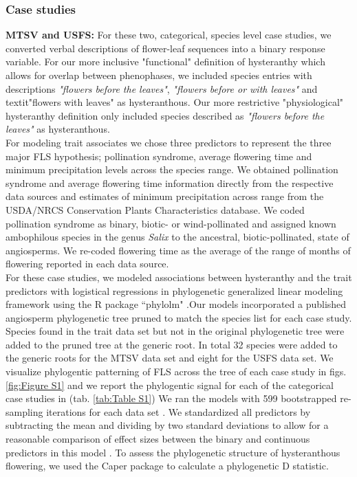 \documentclass[12pt]{article}\usepackage[]{graphicx}\usepackage[]{color}
\begin{document}
\subsubsection*{Case studies}
\indent\indent \textbf{MTSV and USFS:} For these two, categorical, species level case studies, we converted verbal descriptions of flower-leaf sequences into a binary response variable. For our more inclusive "functional" definition of hysteranthy which allows for overlap between phenophases, we included species entries with descriptions \textit{"flowers before the leaves"}, \textit{"flowers before or with leaves"} and textit{"flowers with leaves"} as hysteranthous. Our more restrictive "physiological" hysteranthy definition only included species described as \textit{"flowers before the leaves"} as hysteranthous.\\
\ident For modeling trait associates we chose three predictors to represent the three major FLS hypothesis; pollination syndrome, average flowering time and minimum precipitation levels across the species range. We obtained pollination syndrome and average flowering time information directly from the respective data sources and estimates of minimum precipitation across range from the USDA/NRCS Conservation Plants Characteristics database. We coded pollination syndrome as binary, biotic- or wind-pollinated and assigned known ambophilous species in the genus \textit{Salix} to the ancestral, biotic-pollinated, state of angiosperms. We re-coded flowering time as the average of the range of months of flowering reported in each data source.\\
\indent For these case studies, we modeled associations between hysteranthy and the trait predictors with logistical regressions in phylogenetic generalized linear modeling framework \citep{Ives2010} using the R package ``phylolm" \citep{Ho2014}.Our models incorporated a published angiosperm phylogenetic tree \citep{Zanne2013} pruned to match the species list for each case study. Species found in the trait data set but not in the original phylogenetic tree were added to the pruned tree at the generic root. In total 32 species were added to the generic roots for the MTSV data set and eight for the USFS data set. We visualize phylogentic patterning of FLS across the tree of each case study in figs. \ref{fig:Figure S1} and we report the phylogentic signal for each of the categorical case studies in (tab. \ref{tab:Table S1})
We ran the models with 599 bootstrapped re-sampling iterations for each data set \citep{Wilcox2010}. We standardized all predictors by subtracting the mean and dividing by two standard deviations to allow for a reasonable comparison of effect sizes between the binary and continuous predictors in this model \citep{Gelman2007}. To assess the phylogenetic structure of hysteranthous flowering, we used the Caper package \citep{Orme2013} to calculate a phylogenetic D statistic.\\
\end{document}
